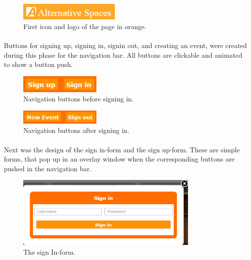 \begin{figure}[ht!]
\centering
\includegraphics[width=50mm]{Sprint2/img/Sprint2-logo1.png}
\caption{First icon and logo of the page in orange. \label{overflow}}
\end{figure}

\paragraph{} Buttons for signing up, signing in, signin out, and creating an event, were created during this phase for the navigation bar. All buttons are clickable and animated to show a button push. \\

\begin{figure}[ht!]
\centering
\includegraphics[width=40mm]{Sprint2/img/Sprint2-buttons1.png}
\caption{Navigation buttons before signing in. \label{overflow}}
\end{figure}

\begin{figure}[ht!]
\centering
\includegraphics[width=40mm]{Sprint2/img/Sprint2-buttons2.png}
\caption{Navigation buttons after signing in. \label{overflow}}
\end{figure}

\paragraph{}
Next was the design of the sign in-form and the sign up-form. These are simple forms, that pop up in an overlay window when the corresponding buttons are pushed in the navigation bar. \\

\begin{figure}[ht!]
\centering
\includegraphics[width=90mm]{Sprint2/img/Sprint2-SignInForm.png}
\caption{The sign In-form. \label{overflow}}
\end{figure}

